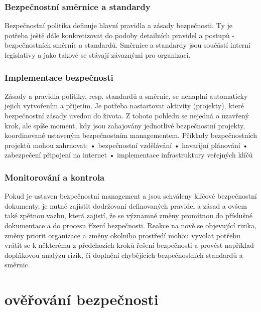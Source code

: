 \documentclass{article}
\begin{document}
\subsubsection{ Bezpečnostní směrnice a standardy}
Bezpečnostní politika definuje hlavní pravidla a zásady bezpečnosti. Ty je potřeba ještě dále
konkretizovat do podoby detailních pravidel a postupů - bezpečnostních směrnic a standardů.
Směrnice a standardy jsou součástí interní legislativy a jako takové se stávají závaznými pro organizaci.
\subsubsection{ Implementace bezpečnosti}
Zásady a pravidla politiky, resp. standardů a směrnic, se nenaplní automaticky jejich vytvořením
a přijetím. Je potřeba nastartovat aktivity (projekty), které bezpečnostní zásady uvedou do života.
Z tohoto pohledu se nejedná o uzavřený krok, ale spíše moment, kdy jsou zahajovány jednotlivé bezpečnostní
projekty, koordinované ustaveným bezpečnostním managementem. Příklady bezpečnostních\newline
projektů mohou zahrnovat:\newline
• bezpečnostní vzdělávání\newline
• havarijní plánování\newline
• zabezpečení připojení na internet\newline
• implementace infrastruktury veřejných klíčů\newline
\subsubsection{Monitorování a kontrola}
Pokud je ustaven bezpečnostní management a jsou schváleny klíčové bezpečnostní dokumenty, je
nutné zajistit dodržovaní definovaných pravidel a zásad a ovšem také zpětnou vazbu, která zajistí,
že se významné změny promítnou do příslušné dokumentace a do procesu řízení bezpečnosti.
Reakce na nově se objevující rizika, změny priorit organizace a změny okolního prostředí mohou vyvolat
potřebu vrátit se k některému z předchozích kroků řešení bezpečnosti a provést například doplňkovou
analýzu rizik, či doplnění chybějících bezpečnostních standardů a směrnic. 
\section{ověřování bezpečnosti}
\end{document}
